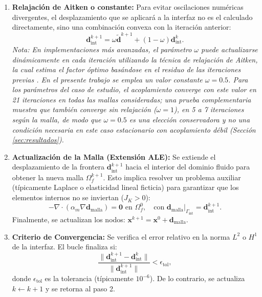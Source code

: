 \documentclass[12pt, letterpaper]{report}
\theoremstyle{definition}
\begin{document}
\begin{enumerate}
    \item \textbf{Relajación de Aitken o constante:}
    Para evitar oscilaciones numéricas divergentes, el desplazamiento que se aplicará a la interfaz no es el calculado directamente, sino una combinación convexa con la iteración anterior:
    \begin{equation}
        \mathbf{d}_{\text{int}}^{k+1} = \omega \tilde{\mathbf{d}}^{k+1} + (1-\omega) \mathbf{d}_{\text{int}}^k.
    \end{equation}
    \emph{Nota: En implementaciones más avanzadas, el parámetro $\omega$ puede actualizarse dinámicamente en cada iteración utilizando la técnica de relajación de Aitken, la cual estima el factor óptimo basándose en el residuo de las iteraciones previas \cite{kuettler2008robust, delaisse2023quasinewton}. En el presente trabajo se emplea un valor constante $\omega = 0.5$. Para los parámetros del caso de estudio, el acoplamiento converge con este valor en 21 iteraciones en todas las mallas consideradas; una prueba complementaria muestra que también converge sin relajación ($\omega = 1$), en 5 a 7 iteraciones según la malla, de modo que $\omega = 0.5$ es una elección conservadora y no una condición necesaria en este caso estacionario con acoplamiento débil (Sección \ref{sec:resultados}).}
    
    \item \textbf{Actualización de la Malla (Extensión ALE):}
    Se extiende el desplazamiento de la frontera $\mathbf{d}_{\text{int}}^{k+1}$ hacia el interior del dominio fluido para obtener la nueva malla $\Omega_f^{k+1}$. Esto implica resolver un problema auxiliar (típicamente Laplace o elasticidad lineal ficticia) para garantizar que los elementos internos no se inviertan ($J_K > 0$):
    \[
    -\nabla \cdot (\alpha_m \nabla \mathbf{d}_{\text{malla}}) = \mathbf{0} \text{ en } \Omega_f^0, \quad \text{con } \mathbf{d}_{\text{malla}}|_{\Gamma_{\text{int}}} = \mathbf{d}_{\text{int}}^{k+1}.
    \]
    Finalmente, se actualizan los nodos: $\mathbf{x}^{k+1} = \mathbf{x}^0 + \mathbf{d}_{\text{malla}}$.
    
    \item \textbf{Criterio de Convergencia:}
    Se verifica el error relativo en la norma $L^2$ o $H^1$ de la interfaz. El bucle finaliza si:
    \[
    \frac{\| \mathbf{d}_{\text{int}}^{k+1} - \mathbf{d}_{\text{int}}^k \|}{\| \mathbf{d}_{\text{int}}^{k+1} \|} < \epsilon_{\text{tol}},
    \]
    donde $\epsilon_{\text{tol}}$ es la tolerancia (típicamente $10^{-6}$). De lo contrario, se actualiza\\ $k \leftarrow k+1$ y se retorna al paso 2.
\end{enumerate}
\end{document}
